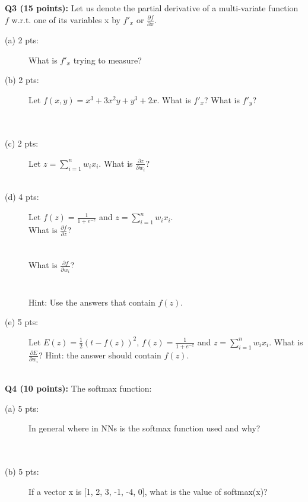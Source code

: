 \documentclass[11pt]{article}
\begin{document}
\vspace{0.4 in}
\noindent
       {\bf Q3 (15 points):} Let us denote the partial derivative of a
       multi-variate function $f$ w.r.t. one of its variables x by
       $f'_x$ or $\frac{\partial f}{\partial x}$.         
\begin{description}
\item [(a) 2 pts:] What is $f'_x$ trying to measure? \\
\item [(b) 2 pts:] Let $f(x,y)=x^3 + 3x^2y+y^3 + 2x$. What is $f'_x$?
  What is $f'_y$? \\ \\  \\
\item [(c) 2 pts:] Let $z = \sum_{i=1}^n w_i x_i$.
  What is $\frac{\partial z}{\partial w_i}$? \\ \\
  
\item [(d) 4 pts:] Let $f(z)=\frac{1}{1+e^{-z}}$ and $z = \sum_{i=1}^n w_i x_i$. \\
       What is $\frac{\partial f}{\partial z}$? \\ \\ \\ 
       What is $\frac{\partial f}{\partial w_i}$? \\ \\ \\
       Hint: Use the answers that contain $f(z)$.

\item [(e) 5 pts:] Let $E(z)=\frac{1}{2}(t - f(z))^2$,
       $f(z)=\frac{1}{1+e^{-z}}$ and $z = \sum_{i=1}^n w_i x_i$.
  What is $\frac{\partial E}{\partial w_i}$? Hint: the answer should contain $f(z)$. \\ \\
\end{description}


  
\vspace{0.4 in}
\noindent
{\bf Q4 (10 points):} The softmax function:
\begin{description}
\item [(a) 5 pts:] In general where in NNs is the softmax function used and why? \\ \\ \\

\item [(b) 5 pts:] If a vector x is [1, 2, 3, -1, -4, 0], what is the value of
  softmax(x)? \\ \\ \\ 
\end{description}
 
\end{document}
